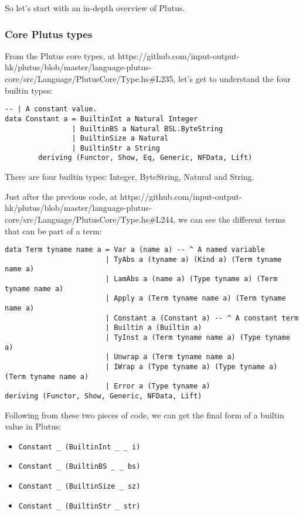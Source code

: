 \documentclass{article}
\begin{document}
So let's start with an in-depth overview of Plutus.

\subsubsection{Core Plutus types}
From the Plutus core types, at https://github.com/input-output-hk/plutus/blob/master/language-plutus-core/src/Language/PlutusCore/Type.hs\#L235, let's get to understand the four builtin types:
\begin{verbatim}
-- | A constant value.
data Constant a = BuiltinInt a Natural Integer
                | BuiltinBS a Natural BSL.ByteString
                | BuiltinSize a Natural
                | BuiltinStr a String
        deriving (Functor, Show, Eq, Generic, NFData, Lift)
\end{verbatim}

There are four builtin types: Integer, ByteString, Natural and String.

\pagebreak

Just after the previous code, at https://github.com/input-output-hk/plutus/blob/master/language-plutus-core/src/Language/PlutusCore/Type.hs\#L244, we can see the different terms that can be part of a term:
\begin{verbatim}
data Term tyname name a = Var a (name a) -- ^ A named variable
                        | TyAbs a (tyname a) (Kind a) (Term tyname name a)
                        | LamAbs a (name a) (Type tyname a) (Term tyname name a)
                        | Apply a (Term tyname name a) (Term tyname name a)
                        | Constant a (Constant a) -- ^ A constant term
                        | Builtin a (Builtin a)
                        | TyInst a (Term tyname name a) (Type tyname a)
                        | Unwrap a (Term tyname name a)
                        | IWrap a (Type tyname a) (Type tyname a) (Term tyname name a)
                        | Error a (Type tyname a)
deriving (Functor, Show, Generic, NFData, Lift)
\end{verbatim}

Following from these two pieces of code, we can get the final form of a builtin value in Plutus:
\begin{itemize}
\item \verb|Constant _ (BuiltinInt _ _ i)|
\item \verb|Constant _ (BuiltinBS _ _ bs)|
\item \verb|Constant _ (BuiltinSize _ sz)|
\item \verb|Constant _ (BuiltinStr _ str)|
\end{itemize}
\end{document}
